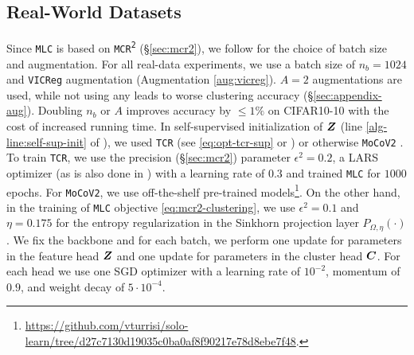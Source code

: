 \documentclass[10pt,twocolumn,letterpaper]{article}
\newcommand{\ours}{MLC}
\newcommand{\mours}{\texttt{\ours}}
\newcommand{\mcr}{\texttt{MCR\textsuperscript{2}}}
\begin{document}
   \subsection{Real-World Datasets} \label{sec:details-real-exp}
   \myparagraph{\mours{}}
   Since \mours{} is based on \mcr{} (\S \ref{sec:mcr2}), we follow \cite{yu2020learning, Li2022-vq} for the choice of batch size and augmentation. For all real-data experiments, we use a batch size of $n_{b}=1024$ and \texttt{VICReg} \cite{Bardes2022-gc} augmentation (Augmentation \ref{aug:vicreg}). $A=2$ augmentations are used, while not using any leads to worse clustering accuracy (\S \ref{sec:appendix-aug}). Doubling $n_b$ or $A$ improves accuracy by $\leq1\%$ on CIFAR10-10 with the cost of increased running time.
   In self-supervised initialization of ${\bm{Z}}$ (line \ref{alg-line:self-sup-init} of ), we used \texttt{TCR} (see \eqref{eq:opt-tcr-sup} or \cite{Li2022-vq}) or otherwise \texttt{MoCoV2} \cite{Chen2020-ws}. To train \texttt{TCR}, we use the precision (\S \ref{sec:mcr2}) parameter $\epsilon^2=0.2$, a LARS optimizer \cite{You2017-xl} (as is also done in \cite{Chen2020-zj,Li2022-vq}) with a learning rate of $0.3$ and trained \mours{} for $1000$ epochs. For \texttt{MoCoV2}, we use off-the-shelf pre-trained models\footnote{\scriptsize\url{https://github.com/vturrisi/solo-learn/tree/d27c7130d19035c0ba0af8f90217e78d8ebe7f48}.}. On the other hand, in the training of \mours{} objective \eqref{eq:mcr2-clustering}, we use $\epsilon^2=0.1$ 
   and $\eta=0.175$ for the entropy regularization in the Sinkhorn projection \cite{Eisenberger2022-oo} layer $P_{\Omega, \eta}(\cdot)$. We fix the backbone and for each batch, we perform one update for parameters in the feature head ${\bm{Z}}$ and one update for parameters in the cluster head ${\bm{C}}$. For each head we use one SGD optimizer \cite{Robbins1951-jb}  with a learning rate of $10^{-2}$, momentum of $0.9$, and weight decay of $5\cdot 10^{-4}$. 


\setcounter{algorithm}{0}
\end{document}
